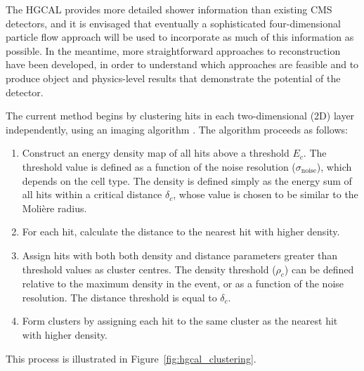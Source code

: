 The HGCAL provides more detailed shower information than existing CMS detectors, 
and it is envisaged that eventually a sophisticated four-dimensional particle flow approach will be used to incorporate as much of this information as possible. 
In the meantime, more straightforward approaches to reconstruction have been developed, 
in order to understand which approaches are feasible and to produce object and physics-level results that demonstrate the potential of the detector. 

The current method begins by clustering hits in each two-dimensional (2D) layer independently, using an imaging algorithm \cite{ClusteringAlgo}.
The algorithm proceeds as follows:
\begin{enumerate}
  \item Construct an energy density map of all hits above a threshold $E_c$. 
  The threshold value is defined as a function of the noise resolution ($\sigma_{\textrm{noise}}$), which depends on the cell type.
  The density is defined simply as the energy sum of all hits within a critical distance $\delta_c$, 
  whose value is chosen to be similar to the Moli\`ere radius.
  \item For each hit, calculate the distance to the nearest hit with higher density.
  \item Assign hits with both both density and distance parameters greater than threshold values as cluster centres.
  The density threshold ($\rho_c$) can be defined relative to the maximum density in the event,
  or as a function of the noise resolution.
  The distance threshold is equal to $\delta_c$.
  \item Form clusters by assigning each hit to the same cluster as the nearest hit with higher density.
\end{enumerate}
This process is illustrated in Figure~\ref{fig:hgcal_clustering}.

